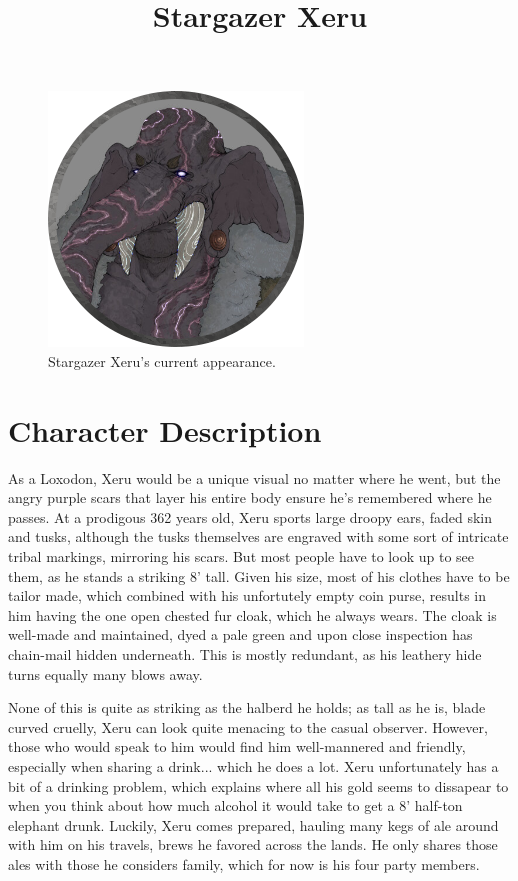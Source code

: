 \documentclass[12pt]{article}
\begin{document}
 
\title{Stargazer Xeru}
\date{}

\maketitle
\begin{figure}[!htb]
  \centering
  \includegraphics[width=.7\textwidth]{./resources/Stargazer_Xeru}
  \caption{Stargazer Xeru's current appearance.}
\end{figure}

\clearpage

\section{Character Description}

As a Loxodon, Xeru would be a unique visual no matter where he went, but the
angry purple scars that layer his entire body ensure he's remembered where he
passes. At a prodigous 362 years old, Xeru sports large droopy ears, faded skin
and tusks, although the tusks themselves are engraved with some sort of
intricate tribal markings, mirroring his scars. But most people have to look up
to see them, as he stands a striking 8' tall. Given his size, most of his
clothes have to be tailor made, which combined with his unfortutely empty coin
purse, results in him having the one open chested fur cloak, which he always
wears. The cloak is well-made and maintained, dyed a pale green and upon close
inspection has chain-mail hidden underneath. This is mostly redundant, as his
leathery hide turns equally many blows away.

None of this is quite as striking as the halberd he holds; as tall as he is,
blade curved cruelly, Xeru can look quite menacing to the casual observer.
However, those who would speak to him would find him well-mannered and friendly,
especially when sharing a drink... which he does a lot. Xeru unfortunately has
a bit of a drinking problem, which explains where all his gold seems to
dissapear to when you think about how much alcohol it would take to get a 8'
half-ton elephant drunk. Luckily, Xeru comes prepared, hauling many kegs of ale
around with him on his travels, brews he favored across the lands. He only
shares those ales with those he considers family, which for now is his four
party members.
\end{document}
